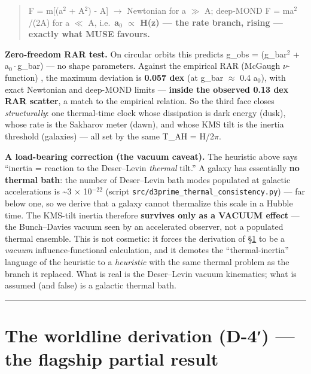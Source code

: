 \documentclass[aps,prd,preprint,nofootinbib,superscriptaddress]{revtex4-2}
\begin{document}
\begin{quote}
F = m{[}\surd (a\(^{2}\) + A\(^{2}\)) - A{]} \(\to\) Newtonian for a
\(\gg\) A; deep-MOND F = ma\(^{2}\)/(2A) for a \(\ll\) A,
i.e.~\textbf{a\(_{0}\) \(\propto\) H(z) --- the rate branch, rising ---
exactly what MUSE favours.}
\end{quote}

\textbf{Zero-freedom RAR test.} On circular orbits this predicts g\_obs
= \surd (g\_bar\(^{2}\) + a\(_{0}\cdot\)g\_bar) --- no shape parameters.
Against the empirical RAR (McGaugh \(\nu\)-function)
\citep{McGaugh:2016leg, Lelli:2016cui}, the maximum deviation is
\textbf{0.057 dex} (at g\_bar \(\approx\) 0.4 a\(_{0}\)), with exact
Newtonian and deep-MOND limits --- \textbf{inside the observed 0.13 dex
RAR scatter}, a match to the empirical relation. So the third face
closes \emph{structurally}: one thermal-time clock whose dissipation is
dark energy (dusk), whose rate is the Sakharov meter (dawn), and whose
KMS tilt is the inertia threshold (galaxies) --- all set by the same
T\_AH = H/2\(\pi\).

\textbf{A load-bearing correction (the vacuum caveat).} The heuristic
above says ``inertia = reaction to the Deser--Levin \emph{thermal}
tilt.'' A galaxy has essentially \textbf{no thermal bath}: the number of
Deser--Levin bath modes populated at galactic accelerations is
\textasciitilde3 × 10\(^{-22}\) (script
\texttt{src/\allowbreak d3prime\_\allowbreak thermal\_\allowbreak consistency.\allowbreak py}) --- far below one, so we
derive that a galaxy cannot thermalize this scale in a Hubble time. The
KMS-tilt inertia therefore \textbf{survives only as a VACUUM effect} ---
the Bunch--Davies vacuum seen by an accelerated observer, not a
populated thermal ensemble. This is not cosmetic: it forces the
derivation of §\ref{sec-6} to be a \emph{vacuum} influence-functional
calculation, and it demotes the ``thermal-inertia'' language of the
heuristic to a \emph{heuristic} with the same thermal problem as the
branch it replaced. What is real is the Deser--Levin vacuum kinematics;
what is assumed (and false) is a galactic thermal bath.

\begin{center}\rule{0.5\linewidth}{0.5pt}\end{center}

\section{The worldline derivation (D-4′) --- the flagship partial
result}\label{sec-6}
\end{document}
